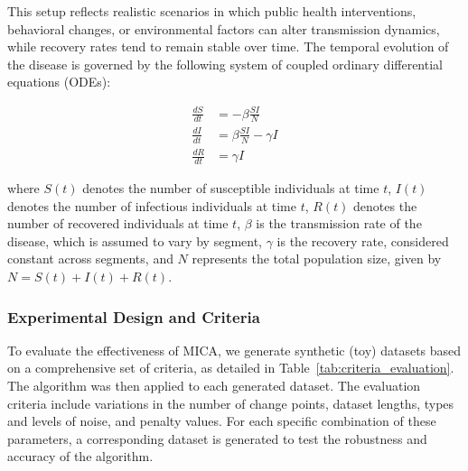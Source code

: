 \documentclass[10pt,letterpaper]{article}
\begin{document}
This setup reflects realistic scenarios in which public health interventions, behavioral changes, or environmental factors can alter transmission dynamics, while recovery rates tend to remain stable over time. The temporal evolution of the disease is governed by the following system of coupled ordinary differential equations (ODEs):



\begin{align}\label{SIR}
    \frac{dS}{dt} &= -\beta \frac{S I}{N} \nonumber \\
    \frac{dI}{dt} &= \beta \frac{S I}{N} - \gamma I \\
    \frac{dR}{dt} &= \gamma I \nonumber
\end{align}

where \( S(t) \) denotes the number of susceptible individuals at time \( t \), \( I(t) \) denotes the number of infectious individuals at time \( t \), \( R(t) \) denotes the number of recovered individuals at time \( t \), \( \beta \) is the transmission rate of the disease, which is assumed to vary by segment, \( \gamma \) is the recovery rate, considered constant across segments, and \( N \) represents the total population size, given by \( N = S(t) + I(t) + R(t) \).

\subsubsection*{Experimental Design and Criteria}

To evaluate the effectiveness of MICA, we generate synthetic (toy) datasets based on a comprehensive set of criteria, as detailed in Table~\ref{tab:criteria_evaluation}. The algorithm was then applied to each generated dataset. The evaluation criteria include variations in the number of change points, dataset lengths, types and levels of noise, and penalty values. For each specific combination of these parameters, a corresponding dataset is generated to test the robustness and accuracy of the algorithm.
\end{document}
